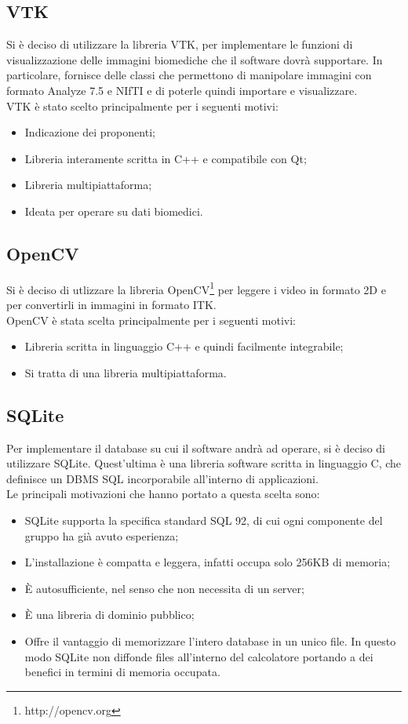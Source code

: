 	\subsection{VTK}
	\label{vtk}
		Si è deciso di utilizzare la libreria VTK\glossario{}, per implementare le funzioni di visualizzazione delle immagini biomediche che il software dovrà supportare. In particolare, fornisce delle classi che permettono di manipolare immagini con formato Analyze 7.5\glossario{} e NIfTI\glossario{} e di poterle quindi importare e visualizzare.\\
		VTK\glossario{} è stato scelto principalmente per i seguenti motivi:
		\begin{itemize}
		\item Indicazione dei proponenti;
		\item Libreria interamente scritta in C++ e compatibile con Qt\glossario{};
		\item Libreria multipiattaforma;
		\item Ideata per operare su dati biomedici.
		\end{itemize}
		
	\subsection{OpenCV}
	\label{opencv}
	Si è deciso di utlizzare la libreria OpenCV\footnote{http://opencv.org} per leggere i video in formato 2D e per convertirli in immagini in formato ITK\g{}.
	\\OpenCV è stata scelta principalmente per i seguenti motivi:
		\begin{itemize}
			\item Libreria scritta in linguaggio C++ e quindi facilmente integrabile;
			\item Si tratta di una libreria multipiattaforma.
		\end{itemize}
	
	\subsection{SQLite}
	\label{sqlite}
	Per implementare il database su cui il software andrà ad operare, si è deciso di utilizzare SQLite. Quest'ultima è una libreria software scritta in linguaggio C, che definisce un DBMS SQL incorporabile all'interno di applicazioni.\\
	Le principali motivazioni che hanno portato a questa scelta sono:
	\begin{itemize}
	\item SQLite supporta la specifica standard SQL 92, di cui ogni componente del gruppo ha già avuto esperienza;
	\item L'installazione è compatta e leggera, infatti occupa solo 256KB di memoria;
	\item È autosufficiente, nel senso che non necessita di un server;
	\item È una libreria di dominio pubblico;
	\item Offre il vantaggio di memorizzare l'intero database in un unico file. In questo modo SQLite non diffonde files all'interno del calcolatore portando a dei benefici in termini di memoria occupata.
	\end{itemize}